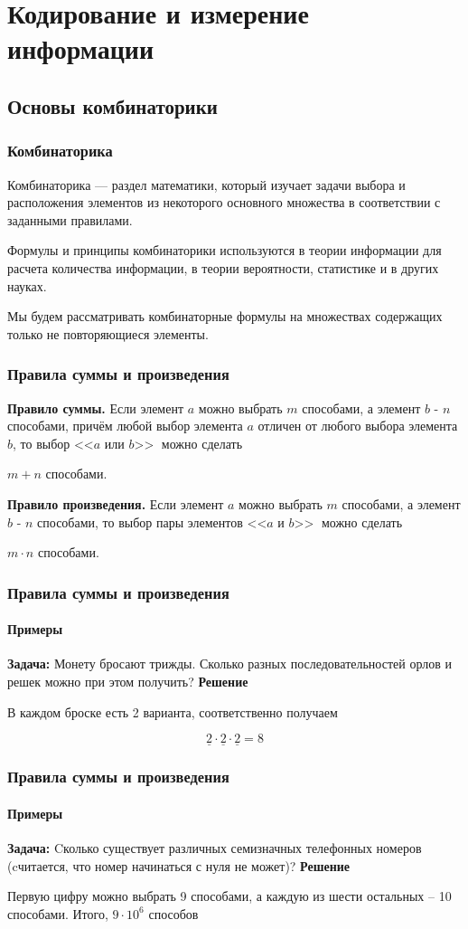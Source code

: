 \section{Кодирование и измерение информации}
\subsection{Основы комбинаторики}
\begin{frame}
\frametitle{Комбинаторика}
Комбинаторика --- раздел математики, который изучает задачи выбора и расположения элементов из некоторого основного множества в соответствии с заданными правилами. 

Формулы и  принципы  комбинаторики  используются  в  теории информации для расчета количества информации, в теории вероятности, статистике и в других науках. 

Мы будем рассматривать комбинаторные формулы на множествах содержащих только не повторяющиеся элементы.
\end{frame}


\begin{frame}
\frametitle{Правила суммы и произведения}
{\bf Правило суммы.} Если элемент $a$ можно выбрать $m$ способами, а элемент
$b$ - $n$ способами, причём любой выбор элемента $a$ отличен от любого выбора
элемента $b$, то выбор <<$a$ или $b$>>$\;$ можно сделать

$m+n$ способами.

\pause

{\bf Правило произведения.} Если элемент $a$ можно выбрать $m$ способами, а элемент
$b$ - $n$ способами, то выбор пары элементов <<$a$ и $b$>>$\;$ можно сделать

 $m\cdot n$ способами.
\end{frame}

\begin{frame}
\frametitle{Правила суммы и произведения}
\framesubtitle{Примеры}
\textbf{Задача:} Монету бросают трижды. Сколько разных последовательностей орлов и решек можно при этом получить?
\pause
\textbf{Решение}

В каждом броске есть 2 варианта, соответственно получаем

$$ \underline{2}\cdot \underline{2} \cdot \underline{2} = 8 $$


\end{frame}

\begin{frame}
\frametitle{Правила суммы и произведения}
\framesubtitle{Примеры}
\textbf{Задача:} Cколько существует различных семизначных телефонных номеров (cчитается, что номер начинаться с нуля не может)? 
\pause
\textbf{Решение}

Первую цифру можно выбрать 9 способами, а каждую из шести остальных – 10 способами. Итого, $9\cdot10^6$ способов

\end{frame}

